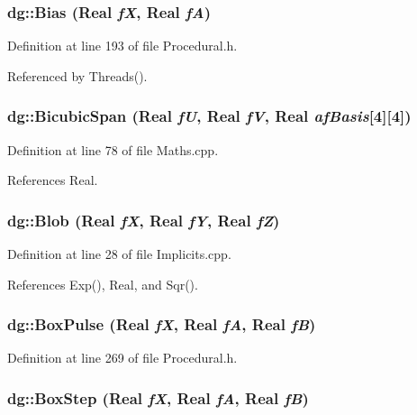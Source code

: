 \subsubsection{ dg::Bias ({\bf Real} {\em f\-X}, {\bf Real} {\em f\-A})\hspace{0.3cm}{\tt  [inline]}}\label{namespacedg_a150}




Definition at line 193 of file Procedural.h.

Referenced by Threads().
\subsubsection{ dg::Bicubic\-Span ({\bf Real} {\em f\-U}, {\bf Real} {\em f\-V}, {\bf Real} {\em af\-Basis}[4][4])}\label{namespacedg_a119}




Definition at line 78 of file Maths.cpp.

References Real.
\subsubsection{ dg::Blob ({\bf Real} {\em f\-X}, {\bf Real} {\em f\-Y}, {\bf Real} {\em f\-Z})}\label{namespacedg_a68}




Definition at line 28 of file Implicits.cpp.

References Exp(), Real, and Sqr().
\subsubsection{ dg::Box\-Pulse ({\bf Real} {\em f\-X}, {\bf Real} {\em f\-A}, {\bf Real} {\em f\-B})\hspace{0.3cm}{\tt  [inline]}}\label{namespacedg_a158}




Definition at line 269 of file Procedural.h.
\subsubsection{ dg::Box\-Step ({\bf Real} {\em f\-X}, {\bf Real} {\em f\-A}, {\bf Real} {\em f\-B})\hspace{0.3cm}{\tt  [inline]}}\label{namespacedg_a155}




